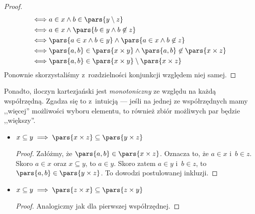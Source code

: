\begin{itemize}
\begin{proof}
\begin{equation*}
\begin{split}
                        \iff& a \in x \land b \in \pars{y \setminus z }\\
                        \iff& a \in x \land \pars{b \in y \land b \not\in z }\\
                        \iff& \pars{a \in x \land b \in y} \land \pars{a \in x \land b \not \in z }\\
                        \iff& \pars{a, b} \in \pars{x \times y} \land \pars{a, b} \not\in \pars{x \times z }\\
                        \iff& \pars{a, b} \in \pars{x \times y} \setminus \pars{x \times z}
                \end{split}
            \end{equation*}
            Ponownie skorzystaliśmy z~rozdzielności konjunkcji względem niej samej.
        \end{proof}
\end{itemize}
Ponadto, iloczyn kartezjański jest \emph{monotoniczny} ze względu na każdą współrzędną. Zgadza się to z~intuicją --- jeśli na jednej ze współrzędnych mamy ,,więcej'' możliwości wyboru elementu, to również zbiór możliwych par będzie ,,większy''.
\begin{itemize}
    \item \(x \subseteq y \implies \pars{x \times z} \subseteq \pars{y \times z}\)
        \begin{proof}
            Załóżmy, że \(\pars{a, b} \in \pars{x \times z}\). Oznacza to, że \(a \in x\) i~\(b \in z\). Skoro \(a \in x\) oraz \(x \subseteq y\), to \(a \in y\). Skoro zatem \(a \in y\) i~\(b \in z\), to \(\pars{a, b} \in \pars{y \times z}\). To dowodzi postulowanej inkluzji.
        \end{proof}
    \item \(x \subseteq y \implies \pars{z \times x} \subseteq \pars{z \times y}\)
        \begin{proof}
            Analogiczny jak dla pierwszej współrzędnej.
        \end{proof}
\end{itemize}